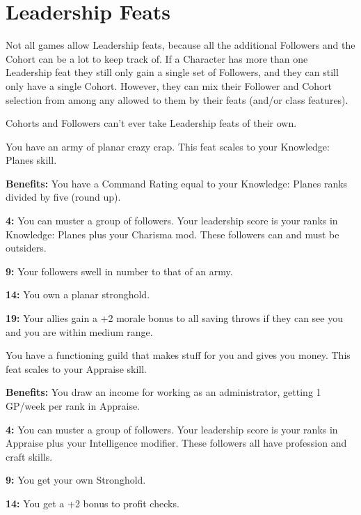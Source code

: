 \section{Leadership Feats}

Not all games allow Leadership feats, because all the additional Followers and the Cohort can be a lot to keep track of. If a Character has more than one Leadership feat they still only gain a single set of Followers, and they can still only have a single Cohort. However, they can mix their Follower and Cohort selection from among any allowed to them by their feats (and/or class features).

Cohorts and Followers can't ever take Leadership feats of their own.


You have an army of planar crazy crap. This feat scales to your Knowledge: Planes skill.

\textbf{Benefits:} You have a Command Rating equal to your Knowledge: Planes ranks divided by five (round up).

\textbf{4:} You can muster a group of followers. Your leadership score is your ranks in Knowledge: Planes plus your Charisma mod. These followers can and must be outsiders.

\textbf{9:} Your followers swell in number to that of an army.

\textbf{14:} You own a planar stronghold.

\textbf{19:} Your allies gain a +2 morale bonus to all saving throws if they can see you and you are within medium range.


You have a functioning guild that makes stuff for you and gives you money. This feat scales to your Appraise skill.

\textbf{Benefits:} You draw an income for working as an administrator, getting 1 GP/week per rank in Appraise.

\textbf{4:} You can muster a group of followers. Your leadership score is your ranks in Appraise plus your Intelligence modifier. These followers all have profession and craft skills.

\textbf{9:} You get your own Stronghold.

\textbf{14:} You get a +2 bonus to profit checks.


